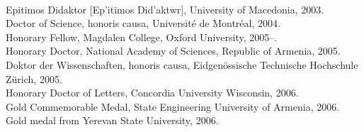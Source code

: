 \\Epitimos Didaktor [{\grk Ep'itimos Did'aktwr}], %
 University of Macedonia, 2003. %
\\Doctor of Science, honoris causa, Universit\'e de Montr\'eal, 2004. %
\\Honorary Fellow, Magdalen College, Oxford University, 2005--.
\\Honorary Doctor, National Academy of Sciences,
 Republic of Armenia, 2005. %
\\Doktor der Wissenschaften, honoris causa, Eidgen\"ossische Technische
 Hochschule Z\"urich, 2005. %
\\Honorary Doctor of Letters, Concordia University Wisconsin, 2006. %
\\Gold Commemorable Medal, %
 State Engineering University of Armenia, 2006.
\\Gold medal from Yerevan State University, 2006.

